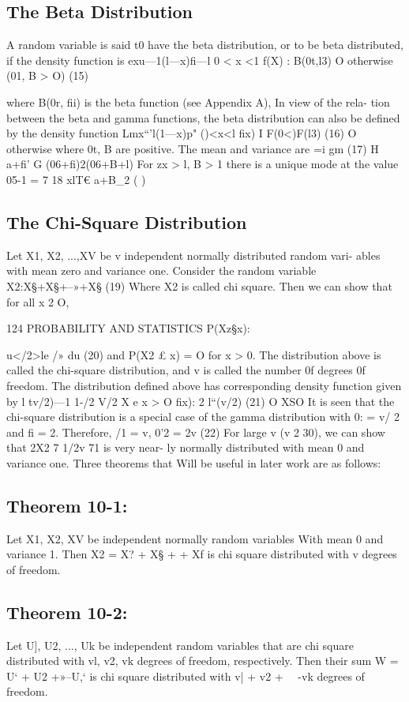 {{\subsection{The Beta Distribution}
A random variable is said t0 have the beta distribution, or to be beta distributed, if the density function is
exu—1(l—x)ﬁ—l 0 < x <1
f(X) : B(0t,l3)
O otherwise (01, B > O) (15)



where B(0r, ﬁi) is the beta function (see Appendix A), In view of the rela-
tion between the beta and gamma functions, the beta distribution can
also be deﬁned by the density function
Lmx“'l(1—x)p" ()<x<l
ﬁx) I F(0<)F(l3) (16)
O otherwise
where 0t, B are positive. The mean and variance are
=i gm (17)
H a+ﬁ’ G (06+ﬁ)2(06+B+l)
For zx > l, B > 1 there is a unique mode at the value
05-1
= 7 18
xlT\OKl€ a+B_2 ( )
\subsection{The Chi-Square Distribution}
Let X1, X2, ...,XV be v independent normally distributed random vari-
ables with mean zero and variance one. Consider the random variable
X2:X§+X§+--»+X§ (19)
Where X2 is called chi square. Then we can show that for all x 2 O,



124 PROBABILITY AND STATISTICS
P(Xz§x): {u</2>le /» du (20)
and P(X2 £ x) = O for x > 0.
The distribution above is called the chi-square distribution, and v is
called the number 0f degrees 0f freedom. The distribution deﬁned above
has corresponding density function given by
l tv/2)—1 1-/2
V/2 X e x > O
ﬁx): 2 l“(v/2) (21)
O XSO
It is seen that the chi-square distribution is a special case of the
gamma distribution with 0: = v/ 2 and ﬁ = 2. Therefore,
/1 = v, 0'2 = 2v (22)
For large v (v 2 30), we can show that \/2X2 7 1/2v 71 is very near-
ly normally distributed with mean 0 and variance one.
Three theorems that Will be useful in later work are as follows:
\subsection*{Theorem 10-1:} Let X1, X2,  XV be independent normally random
variables With mean 0 and variance 1. Then X2 = X? +
X§ +  + Xf is chi square distributed with v degrees of
freedom.
\subsection*{Theorem 10-2:} Let U], U2, ..., Uk be independent random variables
that are chi square distributed with vl, v2,  vk
degrees of freedom, respectively. Then their sum W =
U‘ + U2 +»--U,‘ is chi square distributed with v| + v2 +
~~-vk degrees of freedom.



}}}
